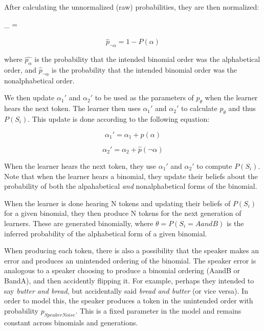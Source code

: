 \documentclass[10pt, letterpaper]{article}
\begin{document}
After calculating the unnormalized (raw) probabilities, they are then
normalized:

\begin{myequation}%
\label{eq:phatalpha}
_{\alpha} =  %
\end{myequation}

\begin{equation}
\label{eq:phatnotalpha}
\hat{p}_{\neg\alpha} = 1 - \hat{P}(\alpha)
\end{equation}

\noindent where \(\hat{p_\alpha}\) is the probability that the intended
binomial order was the alphabetical order, and \(\hat{p}_{\neg\alpha}\)
is the probability that the intended binomial order was the
nonalphabetical order.

We then update \(\alpha_1'\) and \(\alpha_2'\) to be used as the
parameters of \(p_\theta\) when the learner hears the next token. The
learner then uses \(\alpha_1'\) and \(\alpha_2'\) to calculate
\(p_\theta\) and thus \(P(S_i)\). This update is done according to the
following equation:

\begin{equation}
\label{eq:alpha1}
\alpha_1' = \alpha_1 + \hat{p}(\alpha)
\end{equation}

\begin{equation}
\label{eq:alpha2}
\alpha_2' = \alpha_2 + \hat{p}(\neg\alpha)
\end{equation}

When the learner hears the next token, they use \(\alpha_1'\) and
\(\alpha_2'\) to compute \(P(S_i)\). Note that when the learner hears a
binomial, they update their beliefs about the probability of both the
alpahabetical \emph{and} nonalphabetical forms of the binomial.

When the learner is done hearing N tokens and updating their beliefs of
\(P(S_i)\) for a given binomial, they then produce N tokens for the next
generation of learners. These are generated binomially, where
\(\theta = P(S_i=AandB)\) is the inferred probability of the
alphabetical form of a given binomial.

When producing each token, there is also a possibility that the speaker
makes an error and produces an unintended ordering of the binomial. The
speaker error is analogous to a speaker choosing to produce a binomial
ordering (AandB or BandA), and then accidently flipping it. For example,
perhaps they intended to say \emph{butter and bread}, but accidentally
said \emph{bread and butter} (or vice versa). In order to model this,
the speaker produces a token in the unintended order with probability
\(p_{SpeakerNoise}\). This is a fixed parameter in the model and remains
constant across binomials and generations.
\end{document}
